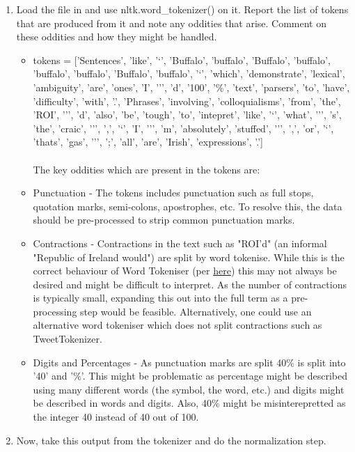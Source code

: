 \documentclass{scrreprt}
\begin{document}
\begin{enumerate}
	\item Load the file in and use nltk.word\_tokenizer() on it. Report the list of tokens that are produced from it and note any oddities that arise. Comment on these oddities and how they might be handled.
		\begin{itemize}
			\item tokens = ['Sentences', 'like', '‘', 'Buffalo', 'buffalo', 'Buffalo', 'buffalo', 'buffalo', 'buffalo', 'Buffalo', 'buffalo', '‘', 'which', 'demonstrate', 'lexical', 'ambiguity', 'are', 'ones', 'I', '’', 'd', '100', '\%', 'text', 'parsers', 'to', 'have', 'difficulty', 'with', '.', 'Phrases', 'involving', 'colloquialisms', 'from', 'the', 'ROI', '’', 'd', 'also', 'be', 'tough', 'to', 'intepret', 'like', '‘', 'what', '’', 's', 'the', 'craic', '’', ',', '‘', 'I', '’', 'm', 'absolutely', 'stuffed', '’', ',', 'or', '‘', 'thats', 'gas', '’', ';', 'all', 'are', 'Irish', 'expressions', '.'] \\
			\\
			The key oddities which are present in the tokens are:
			\item Punctuation - The tokens includes punctuation such as full stops, quotation marks, semi-colons, apostrophes, etc. To resolve this, the data should be pre-processed to strip common punctuation marks.
			\item Contractions - Contractions in the text such as "ROI'd" (an informal "Republic of Ireland would") are split by word tokenise. While this is the correct behaviour of Word Tokeniser (per \href{https://github.com/nltk/nltk/issues/401}{here}) this may not always be desired and might be difficult to interpret. As the number of contractions is typically small, expanding this out into the full term as a pre-processing step would be feasible. Alternatively, one could use an alternative word tokeniser which does not split contractions such as TweetTokenizer.
			\item Digits and Percentages - As punctuation marks are split 40\% is split into '40' and '\%'. This might be problematic as percentage might be described using many different words (the symbol, the word, etc.) and digits might be described in words and digits. Also, 40\% might be misinterepretted as the integer 40 instead of 40 out of 100.
		\end{itemize}
	\item Now, take this output from the  tokenizer and do the normalization step.
		\begin{itemize}

\end{itemize}
\end{enumerate}
\end{document}
